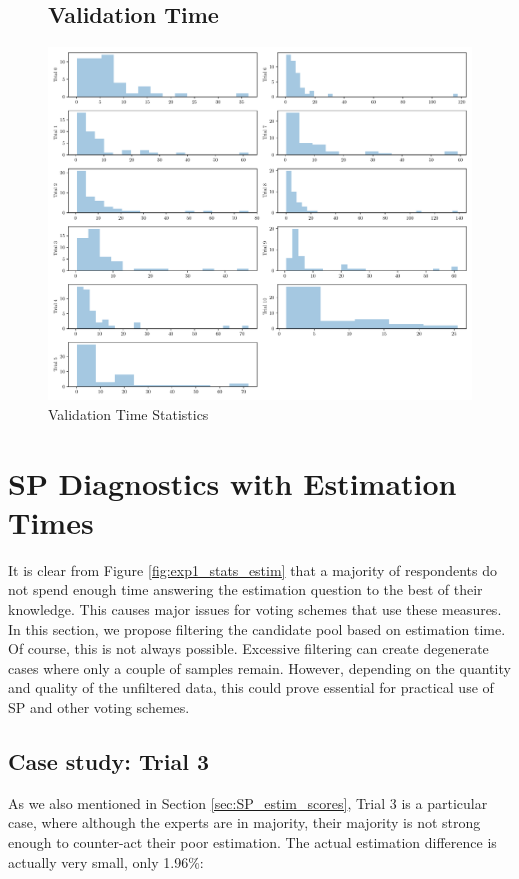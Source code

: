 \documentclass{report}
\theoremstyle{definition}
\begin{document}
\begin{figure}[H]
\hspace*{-3cm}
\begin{minipage}{1.5\linewidth}
\subsection{Validation Time}
    \centering
    \centerline{
    \includegraphics[width=\textwidth]{exp1_stats_valid.pdf}}
    \caption{Validation Time Statistics}
    \label{fig:exp1_stats_valid}
\end{minipage}
\end{figure}

\clearpage
\section{SP Diagnostics with Estimation Times}
\label{sec:sp_diag}
It is clear from Figure \ref{fig:exp1_stats_estim} that a majority of respondents  do not spend enough time answering the estimation question to the best of their knowledge. This causes major issues for voting schemes that use these measures. In this section, we propose filtering the candidate pool based on estimation time. Of course, this is not always possible. Excessive filtering can create degenerate cases where only a couple of samples remain. However, depending on the quantity and quality of the unfiltered data, this could prove essential for practical use of SP and other voting schemes.

\subsection{Case study: Trial 3}
As we also mentioned in Section \ref{sec:SP_estim_scores}, Trial 3 is a particular case, where although the experts are in majority, their majority is not strong enough to counter-act their poor estimation. The actual estimation difference is actually very small, only 1.96\%:
\end{document}
